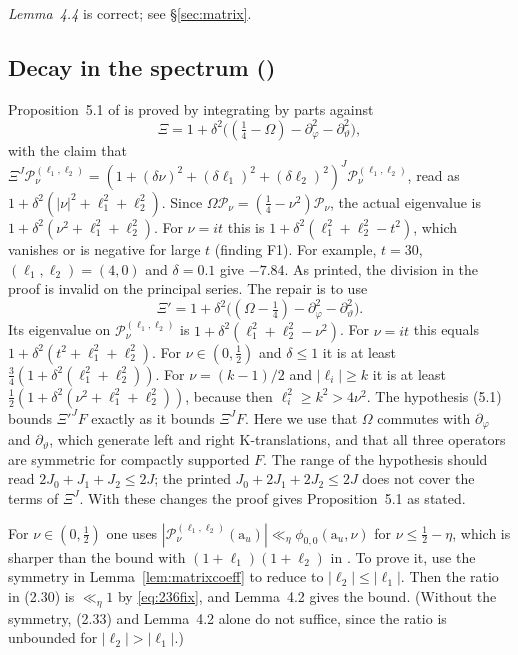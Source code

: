 \documentclass[11pt]{amsart}
\theoremstyle{remark}
\theoremstyle{definition}
\numberwithin{equation}{section}
\newcommand{\K}{\mathrm{K}}
\newcommand{\Pc}{\mathcal{P}}
\newcommand{\ra}{\mathrm{a}}
\begin{document}
\emph{Lemma~4.4} is correct; see \S\ref{sec:matrix}.

\subsection{Decay in the spectrum (\texorpdfstring{\cite[\S5]{GM1}}{[GM1, §5]})}\label{sec:decay}
Proposition~5.1 of \cite{GM1} is proved by integrating by parts against
\[
\Xi=1+\delta^2\bigl((\tfrac14-\Omega)-\partial_\varphi^2-\partial_\vartheta^2\bigr),
\]
with the claim that $\Xi^J\Pc^{(\ell_1,\ell_2)}_\nu=(1+(\delta\nu)^2+(\delta\ell_1)^2+(\delta\ell_2)^2)^J\Pc^{(\ell_1,\ell_2)}_\nu$, read as $1+\delta^2(|\nu|^2+\ell_1^2+\ell_2^2)$. Since $\Omega\Pc_\nu=(\frac14-\nu^2)\Pc_\nu$, the actual eigenvalue is $1+\delta^2(\nu^2+\ell_1^2+\ell_2^2)$. For $\nu=it$ this is $1+\delta^2(\ell_1^2+\ell_2^2-t^2)$, which vanishes or is negative for large $t$ (finding F1). For example, $t=30$, $(\ell_1,\ell_2)=(4,0)$ and $\delta=0.1$ give $-7.84$. As printed, the division in the proof is invalid on the principal series. The repair is to use
\[
\Xi'=1+\delta^2\bigl((\Omega-\tfrac14)-\partial_\varphi^2-\partial_\vartheta^2\bigr).
\]
Its eigenvalue on $\Pc^{(\ell_1,\ell_2)}_\nu$ is $1+\delta^2(\ell_1^2+\ell_2^2-\nu^2)$. For $\nu=it$ this equals $1+\delta^2(t^2+\ell_1^2+\ell_2^2)$. For $\nu\in(0,\frac12)$ and $\delta\le1$ it is at least $\frac34(1+\delta^2(\ell_1^2+\ell_2^2))$. For $\nu=(k-1)/2$ and $|\ell_i|\ge k$ it is at least $\frac12(1+\delta^2(\nu^2+\ell_1^2+\ell_2^2))$, because then $\ell_i^2\ge k^2>4\nu^2$. The hypothesis (5.1) bounds $\Xi'^JF$ exactly as it bounds $\Xi^JF$. Here we use that $\Omega$ commutes with $\partial_\varphi$ and $\partial_\vartheta$, which generate left and right $\K$-translations, and that all three operators are symmetric for compactly supported $F$. The range of the hypothesis should read $2J_0+J_1+J_2\le2J$; the printed $J_0+2J_1+2J_2\le2J$ does not cover the terms of $\Xi^J$. With these changes the proof gives Proposition~5.1 as stated.

For $\nu\in(0,\frac12)$ one uses $|\Pc^{(\ell_1,\ell_2)}_\nu(\ra_u)|\ll_\eta\phi_{0,0}(\ra_u,\nu)$ for $\nu\le\frac12-\eta$, which is sharper than the bound with $(1+\ell_1)(1+\ell_2)$ in \cite{GM1}. To prove it, use the symmetry in Lemma~\ref{lem:matrixcoeff} to reduce to $|\ell_2|\le|\ell_1|$. Then the ratio in (2.30) is $\ll_\eta1$ by \eqref{eq:236fix}, and Lemma~4.2 gives the bound. (Without the symmetry, (2.33) and Lemma~4.2 alone do not suffice, since the ratio is unbounded for $|\ell_2|>|\ell_1|$.)
\end{document}
